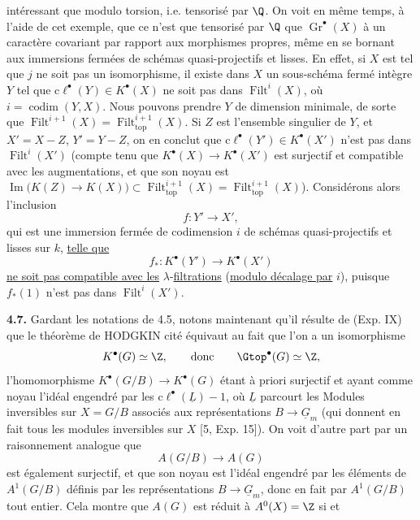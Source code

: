 
intéressant que modulo torsion, i.e. tensorisé par $\Q$. On voit en même temps, à l'aide de cet exemple, que ce n'est que tensorisé par $\Q$ que $\operatorname{Gr}^\bullet(X)$ à un caractère covariant par rapport aux morphismes propres, même en se bornant aux immersions fermées de schémas quasi-projectifs et lisses. En effet, si $X$ est tel que $j$ ne soit pas un isomorphisme, il existe dans $X$ un sous-schéma fermé intègre $Y$ tel que $\mathrm{c}\ell^\bullet(Y)\in K^\bullet(X)$ ne soit pas dans $\operatorname{Filt}^i(X)$, où $i=\operatorname{codim}(Y,X)$. Nous pouvons prendre $Y$ de dimension minimale, de sorte que $\operatorname{Filt}^{i+1}(X)=\operatorname{Filt}_{\mathrm{top}}^{i+1}(X)$. Si $Z$ est l'ensemble singulier de $Y$, et $X'=X-Z$, $Y'=Y-Z$, on en conclut que $\mathrm{c}\ell^\bullet(Y')\in K^\bullet(X')$ n'est pas dans $\operatorname{Filt}^i(X')$ (compte tenu que $K^\bullet(X)\to K^\bullet(X')$ est surjectif et compatible avec les augmentations, et que son noyau est $\operatorname{Im}\bigl(K(Z)\longrightarrow K(X)\bigr)\subset\operatorname{Filt}_{\mathrm{top}}^{i+1}(X)=\operatorname{Filt}_{\mathrm{top}}^{i+1}(X)$). Considérons alors l'inclusion
\[
 f:Y'\longrightarrow X',
\]
qui est une immersion fermée de codimension $i$ de schémas quasi-projectifs et lisses sur $k$, \uline{telle que}
\[
 f_*:K^\bullet(Y')\longrightarrow K^\bullet(X')
\]
\uline{ne soit pas compatible avec les} $\lambda$-\uline{filtrations} (\uline{modulo décalage par} $i$), puisque $f_*(1)$ n'est pas dans $\operatorname{Filt}^i(X')$.

\textbf{4.7.} Gardant les notations de 4.5, notons maintenant qu'il résulte de (Exp. IX) que le théorème de HODGKIN cité équivaut au fait que l'on a un isomorphisme
\[
 K^\bullet(G)\simeq\Z,\qquad\text{donc}\qquad \Gtop^\bullet(G)\simeq\Z,
\]
l'homomorphisme $K^\bullet(G/B)\to K^\bullet(G)$ étant à priori surjectif et ayant comme noyau l'idéal engendré par les $\mathrm{c}\ell^\bullet(\underline{L})-1$, où $\underline{L}$ parcourt les Modules inversibles sur $X=G/B$ associés aux représentations $B\to\underline{G}_m$ (qui donnent en fait tous les modules inversibles sur $X$ [5, Exp. 15]). On voit d'autre part par un raisonnement analogue que
\[
 A(G/B)\longrightarrow A(G)
\]
est également surjectif, et que son noyau est l'idéal engendré par les éléments de $A^1(G/B)$ définis par les représentations $B\to\underline{G}_m$, donc en fait par $A^1(G/B)$ tout entier. Cela montre que $A(G)$ est réduit à $A^0(X)=\Z$ si et
